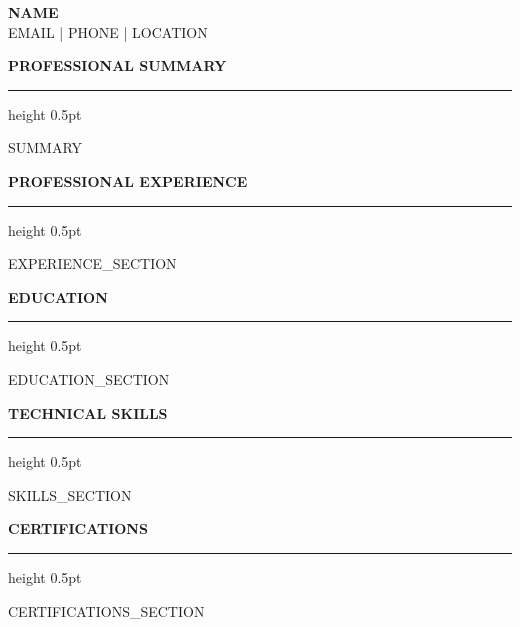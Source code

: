 \documentclass[11pt,letterpaper]{article}
\newcommand{\resumesection}[1]{%
    \vspace{0.5em}
    {\large\bfseries\MakeUppercase{#1}}
    \vspace{0.2em}
    \hrule height 0.5pt
    \vspace{0.3em}
}
\begin{document}
\begin{center}
    {\LARGE\bfseries {{NAME}}} \\
    \vspace{0.2em}
    {{EMAIL}} | {{PHONE}} | {{LOCATION}} \\
\end{center}

\resumesection{Professional Summary}
{{SUMMARY}}

\resumesection{Professional Experience}
{{EXPERIENCE_SECTION}}

\resumesection{Education}
{{EDUCATION_SECTION}}

\resumesection{Technical Skills}
{{SKILLS_SECTION}}

\resumesection{Certifications}
{{CERTIFICATIONS_SECTION}}
\end{document}
